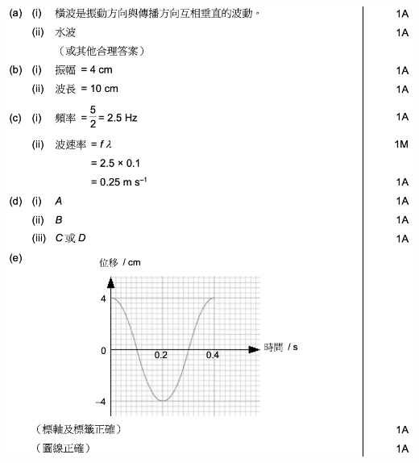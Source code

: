 {}{
    \sol\par{\par\centering\includegraphics[width=\textwidth]{./img/ch1_earlyclass_wave_lq_2024-05-13-13-07-50.png}\par}
}

